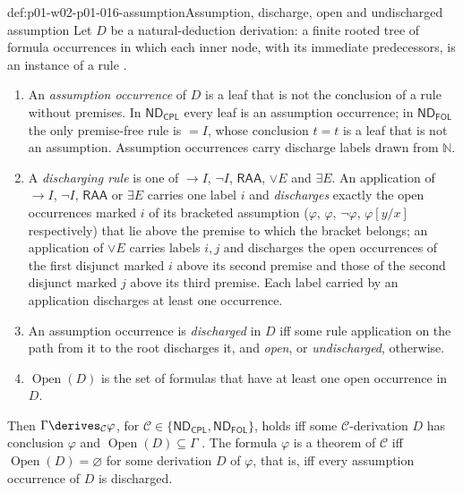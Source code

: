 \begin{hbdefinition}{def:p01-w02-p01-016-assumption}{Assumption, discharge, open and undischarged assumption}
Let \(D\) be a natural-deduction derivation: a finite rooted tree of formula
occurrences in which each inner node, with its immediate predecessors, is an
instance of a rule \cite[ch.~``Natural Deduction and Sequents'', definition
``Natural-deduction derivation'']{FrozenFormalLogicSemanticData}.
\begin{enumerate}
  \item An \emph{assumption occurrence} of \(D\) is a leaf that is not the
        conclusion of a rule without premises. In \(\mathsf{ND}_{\mathsf{CPL}}\)
        every leaf is an assumption occurrence; in
        \(\mathsf{ND}_{\mathsf{FOL}}\) the only premise-free rule is \(=I\),
        whose conclusion \(t=t\) is a leaf that is not an assumption.
        Assumption occurrences carry discharge labels drawn from
        \(\mathbb N\).
  \item A \emph{discharging rule} is one of \(\to I\), \(\neg I\),
        \(\mathsf{RAA}\), \(\lor E\) and \(\exists E\). An application of
        \(\to I\), \(\neg I\), \(\mathsf{RAA}\) or \(\exists E\) carries one
        label \(i\) and \emph{discharges} exactly the open occurrences marked
        \(i\) of its bracketed assumption (\(\varphi\), \(\varphi\),
        \(\neg\varphi\), \(\varphi[y/x]\) respectively) that lie above the
        premise to which the bracket belongs; an application of \(\lor E\)
        carries labels \(i,j\) and discharges the open occurrences of the
        first disjunct marked \(i\) above its second premise and those of the
        second disjunct marked \(j\) above its third premise. Each label
        carried by an application discharges at least one occurrence.
  \item An assumption occurrence is \emph{discharged} in \(D\) iff some rule
        application on the path from it to the root discharges it, and
        \emph{open}, or \emph{undischarged}, otherwise.
  \item \(\operatorname{Open}(D)\) is the set of formulas that have at least
        one open occurrence in \(D\).
\end{enumerate}
Then \(\Gamma\derives_{\mathcal C}\varphi\), for
\(\mathcal C\in\{\mathsf{ND}_{\mathsf{CPL}},\mathsf{ND}_{\mathsf{FOL}}\}\),
holds iff some \(\mathcal C\)-derivation \(D\) has conclusion \(\varphi\) and
\(\operatorname{Open}(D)\subseteq\Gamma\)
\cite[ch.~``Natural Deduction and Sequents'', definition ``Propositional
derivability''; ch.~``First-Order Deduction'', definition ``First-order
derivability'']{FrozenFormalLogicSemanticData}. The formula \(\varphi\) is a
theorem of \(\mathcal C\) iff \(\operatorname{Open}(D)=\varnothing\) for some
derivation \(D\) of \(\varphi\), that is, iff every assumption occurrence of
\(D\) is discharged.
\end{hbdefinition}

